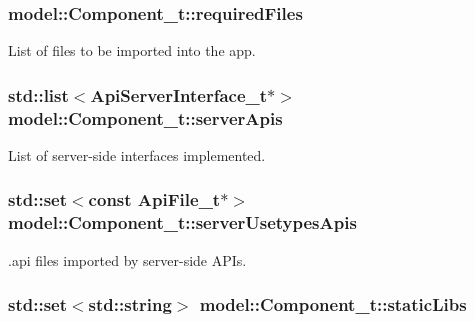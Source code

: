 \subsubsection[{\texorpdfstring{required\+Files}{requiredFiles}}]{ model\+::\+Component\+\_\+t\+::required\+Files}\hypertarget{structmodel_1_1_component__t_a0946dba5a68d1a91ef39df0ce598c7bd}{}\label{structmodel_1_1_component__t_a0946dba5a68d1a91ef39df0ce598c7bd}


List of files to be imported into the app. 

\subsubsection[{\texorpdfstring{server\+Apis}{serverApis}}]{\setlength{\rightskip}{0pt plus 5cm}std\+::list$<${\bf Api\+Server\+Interface\+\_\+t}$\ast$$>$ model\+::\+Component\+\_\+t\+::server\+Apis}\hypertarget{structmodel_1_1_component__t_a138da4905113db318567b19e58155d29}{}\label{structmodel_1_1_component__t_a138da4905113db318567b19e58155d29}


List of server-\/side interfaces implemented. 

\subsubsection[{\texorpdfstring{server\+Usetypes\+Apis}{serverUsetypesApis}}]{\setlength{\rightskip}{0pt plus 5cm}std\+::set$<$const {\bf Api\+File\+\_\+t}$\ast$$>$ model\+::\+Component\+\_\+t\+::server\+Usetypes\+Apis}\hypertarget{structmodel_1_1_component__t_aa6c2555692400fe52460b0f696567fb9}{}\label{structmodel_1_1_component__t_aa6c2555692400fe52460b0f696567fb9}


.api files imported by server-\/side A\+P\+Is. 

\subsubsection[{\texorpdfstring{static\+Libs}{staticLibs}}]{\setlength{\rightskip}{0pt plus 5cm}std\+::set$<$std\+::string$>$ model\+::\+Component\+\_\+t\+::static\+Libs}\hypertarget{structmodel_1_1_component__t_a42409c3935816241afba525c0cd3518f}{}\label{structmodel_1_1_component__t_a42409c3935816241afba525c0cd3518f}


